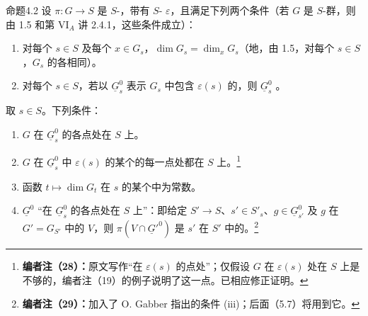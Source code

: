 \begin{SGAresult}{命题}{4.2}
设 $\pi:G\to S$ 是 $S$-，带有 $S$- $\varepsilon$，且满足下列两个条件（若 $G$ 是 $S$-群，则由 1.5 和第 VI$_A$ 讲 2.4.1，这些条件成立）：
\begin{enumerate}
\item[a)] 对每个 $s\in S$ 及每个 $x\in G_s$，$\dim G_s=\dim_xG_s$（地，由 1.5，对每个 $s\in S$，$G_s$ 的各相同）。
\item[b)] 对每个 $s\in S$，若以 $\underline G_s^0$ 表示 $G_s$ 中包含 $\varepsilon(s)$ 的，则 $\underline G_s^0$ 。
\end{enumerate}
取 $s\in S$。下列条件：
\begin{enumerate}
\item[(i)] $G$ 在 $\underline G_s^0$ 的各点处在 $S$ 上。
\item[(i bis)] $G$ 在 $\underline G_s^0$ 中 $\varepsilon(s)$ 的某个的每一点处都在 $S$ 上。\footnote{\textbf{编者注（28）：}原文写作“在 $\varepsilon(s)$ 的点处”；仅假设 $G$ 在 $\varepsilon(s)$ 处在 $S$ 上是不够的，编者注（19）的例子说明了这一点。已相应修正证明。}
\item[(ii)] 函数 $t\mapsto\dim G_t$ 在 $s$ 的某个中为常数。
\item[(iii)] $\underline G^0$ “在 $\underline G_s^0$ 的各点处在 $S$ 上”：即给定 $S'\to S$、$s'\in S'_s$、$g\in\underline G_{s'}^0$ 及 $g$ 在 $G'=G_{S'}$ 中的 $V$，则 $\pi(V\cap\underline G'^0)$ 是 $s'$ 在 $S'$ 中的。\footnote{\textbf{编者注（29）：}加入了 O. Gabber 指出的条件 (iii)；后面（5.7）将用到它。}
\end{enumerate}
\end{SGAresult}
